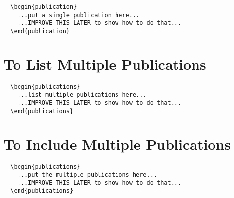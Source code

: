\begin{verbatim}
  \begin{publication}
    ...put a single publication here...
    ...IMPROVE THIS LATER to show how to do that...
  \end{publication}
\end{verbatim}


\section*{To List Multiple Publications}

\begin{verbatim}
  \begin{publications}
    ...list multiple publications here...
    ...IMPROVE THIS LATER to show how to do that...
  \end{publications}
\end{verbatim}


\section*{To Include Multiple Publications}

\begin{verbatim}
  \begin{publications}
    ...put the multiple publications here...
    ...IMPROVE THIS LATER to show how to do that...
  \end{publications}
\end{verbatim}
